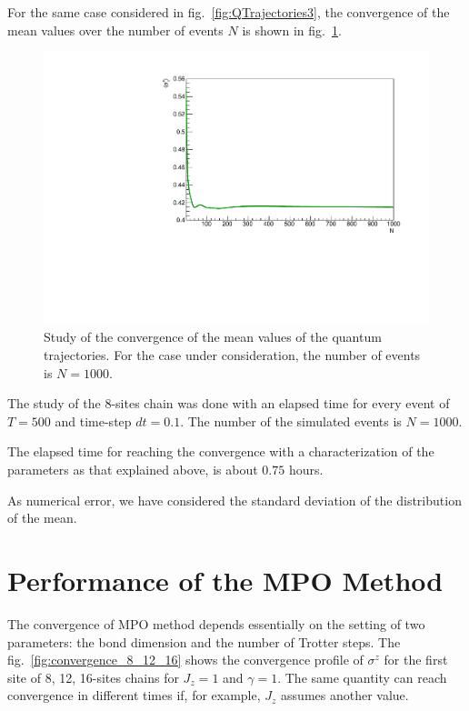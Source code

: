 For the same case considered in fig.~\ref{fig:QTrajectories3}, the convergence of the mean values over the number of events $N$ is shown in fig.~\ref{fig:Convergence_s8J1051}. 

\begin{figure}[H]
    \centering
    \includegraphics[scale=0.5]{Figures/Convergence_s8J1051.pdf}
    \captionsetup{width=1.\linewidth}
    \caption{Study of the convergence of the mean values of the quantum trajectories. For the case under consideration, the number of events is $N = 1000$.}
    \label{fig:Convergence_s8J1051}
\end{figure}

The study of the 8-sites chain was done with an elapsed time for every event of $T = 500$ and time-step $dt = 0.1$. The number of the simulated events is $N = 1000$.

The elapsed time for reaching the convergence with a characterization of the parameters as that explained above, is about $0.75$ hours. 

As numerical error, we have considered the standard deviation of the distribution of the mean.

\section{Performance of the MPO Method}
\label{sec:MPO_errors}
The convergence of MPO method depends essentially on the setting of two parameters: the bond dimension and the number of Trotter steps. The fig.~\ref{fig:convergence_8_12_16} shows the convergence profile of $\sigma^z$ for the first site of 8, 12, 16-sites chains for $J_z = 1$ and $\gamma = 1$. The same quantity can reach convergence in different times if, for example, $J_z$ assumes another value. 

